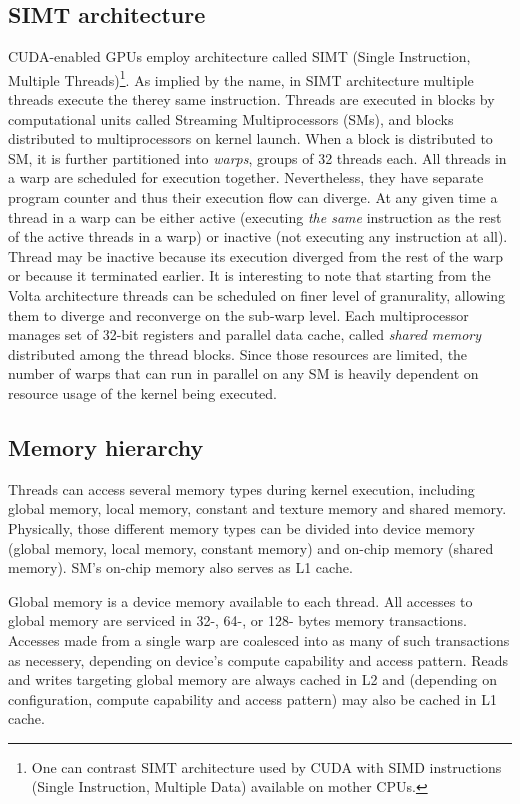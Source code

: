 \subsection{SIMT architecture}
CUDA-enabled GPUs employ architecture called SIMT (Single Instruction, Multiple Threads)\footnote{One can contrast SIMT architecture used by CUDA with SIMD instructions (Single Instruction, Multiple  Data) available on mother CPUs.}. As implied by the name, in SIMT architecture multiple threads execute the therey same instruction. Threads are executed in blocks  by computational units called Streaming Multiprocessors (SMs), and blocks distributed to multiprocessors on kernel launch. When a block is distributed to SM, it is further partitioned into \emph{warps}, groups of 32 threads each. All threads in a warp are scheduled for execution together. Nevertheless, they have separate program counter and thus their execution flow can diverge. At any given time a  thread in a warp can be either active (executing \emph{the same} instruction as the rest of the active threads in a warp) or inactive (not executing any instruction at all). Thread may be inactive because its execution diverged from the rest of the warp or because it terminated earlier. It is interesting to note that starting from the Volta architecture threads can be scheduled on finer level of granurality, allowing them to diverge and reconverge on the sub-warp level. Each multiprocessor manages set of 32-bit registers and parallel data cache, called \emph{shared memory} distributed among the thread blocks. Since those resources are limited, the number of warps that can run in parallel on any SM is heavily dependent on resource usage of the kernel being executed.

\subsection{Memory hierarchy}

Threads can access several memory types during kernel execution, including global memory, local memory, constant and texture memory and shared memory. Physically, those different memory types can be divided into device memory (global memory, local memory, constant memory) and on-chip memory (shared memory). SM's on-chip memory also serves as L1 cache.

Global memory is a device memory available to each thread. All accesses to global memory are serviced in 32-, 64-, or 128- bytes memory transactions. Accesses made from a single warp are coalesced into as many of such transactions as necessery, depending on device's compute capability and access pattern. Reads and writes targeting global memory are always cached in L2 and (depending on configuration, compute capability and access pattern) may also be cached in L1 cache.


